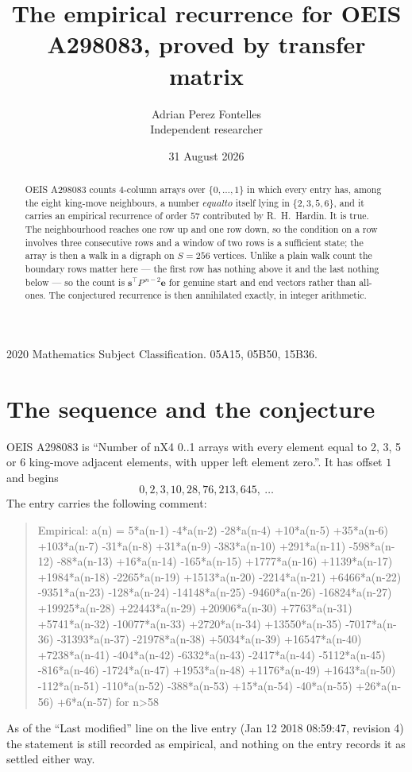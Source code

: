 \documentclass[11pt,a4paper]{article}
\title{The empirical recurrence for OEIS A298083, proved by transfer matrix}
\author{Adrian Perez Fontelles\\ \small Independent researcher}
\date{31 August 2026}
\theoremstyle{plain}
\theoremstyle{definition}
\begin{document}
\maketitle

\begin{abstract}
OEIS A298083 counts $4$-column arrays over $\{0,\dots,1\}$ in which every entry has,
among the eight king-move neighbours, a number $equal to$ itself lying in $\{2,3,5,6\}$, and it carries an empirical
recurrence of order $57$ contributed by R.~H.~Hardin. It is true. The neighbourhood
reaches one row up and one row down, so the condition on a row involves three consecutive
rows and a window of two rows is a sufficient state; the array is then a walk in a digraph
on $S=256$ vertices. Unlike a plain walk count the boundary rows matter here --- the first
row has nothing above it and the last nothing below --- so the count is
$\mathbf{s}^{\!\top}P^{\,n-2}\mathbf{e}$ for genuine start and end vectors rather than
all-ones. The conjectured recurrence is then annihilated exactly, in integer arithmetic.
\end{abstract}

\noindent\small 2020 Mathematics Subject Classification. 05A15, 05B50, 15B36.\normalsize

\section{The sequence and the conjecture}

OEIS A298083 is ``Number of nX4 0..1 arrays with every element equal to 2, 3, 5 or 6 king-move adjacent elements, with upper left element zero.''. It has offset
$1$ and begins
\[
0, 2, 3, 10, 28, 76, 213, 645,\ \dots
\]
The entry carries the following comment:
\begin{quote}\small
Empirical: a(n) = 5*a(n-1) -4*a(n-2) -28*a(n-4) +10*a(n-5) +35*a(n-6) +103*a(n-7) -31*a(n-8) +31*a(n-9) -383*a(n-10) +291*a(n-11) -598*a(n-12) -88*a(n-13) +16*a(n-14) -165*a(n-15) +1777*a(n-16) +1139*a(n-17) +1984*a(n-18) -2265*a(n-19) +1513*a(n-20) -2214*a(n-21) +6466*a(n-22) -9351*a(n-23) -128*a(n-24) -14148*a(n-25) -9460*a(n-26) -16824*a(n-27) +19925*a(n-28) +22443*a(n-29) +20906*a(n-30) +7763*a(n-31) +5741*a(n-32) -10077*a(n-33) +2720*a(n-34) +13550*a(n-35) -7017*a(n-36) -31393*a(n-37) -21978*a(n-38) +5034*a(n-39) +16547*a(n-40) +7238*a(n-41) -404*a(n-42) -6332*a(n-43) -2417*a(n-44) -5112*a(n-45) -816*a(n-46) -1724*a(n-47) +1953*a(n-48) +1176*a(n-49) +1643*a(n-50) -112*a(n-51) -110*a(n-52) -388*a(n-53) +15*a(n-54) -40*a(n-55) +26*a(n-56) +6*a(n-57) for n>58
\end{quote}
As of the ``Last modified'' line on the live entry (Jan 12 2018 08:59:47, revision
4) the statement is still recorded as empirical, and nothing on the entry
records it as settled either way.
\end{document}

